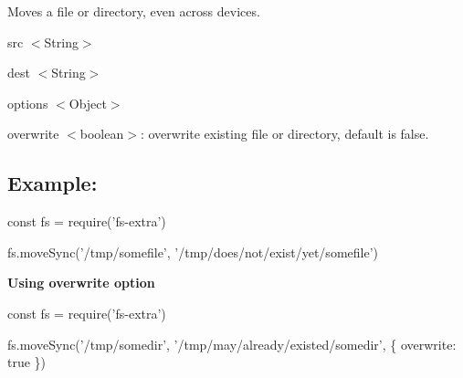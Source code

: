 Moves a file or directory, even across devices.


\begin{DoxyItemize}
\item {\ttfamily src} {\ttfamily $<$String$>$}
\item {\ttfamily dest} {\ttfamily $<$String$>$}
\item {\ttfamily options} {\ttfamily $<$Object$>$}
\begin{DoxyItemize}
\item {\ttfamily overwrite} {\ttfamily $<$boolean$>$}\+: overwrite existing file or directory, default is {\ttfamily false}.
\end{DoxyItemize}
\end{DoxyItemize}

\subsection*{Example\+:}


\begin{DoxyCode}
const fs = require('fs-extra')

fs.moveSync('/tmp/somefile', '/tmp/does/not/exist/yet/somefile')
\end{DoxyCode}


{\bfseries Using {\ttfamily overwrite} option}


\begin{DoxyCode}
const fs = require('fs-extra')

fs.moveSync('/tmp/somedir', '/tmp/may/already/existed/somedir', \{ overwrite: true \})
\end{DoxyCode}
 